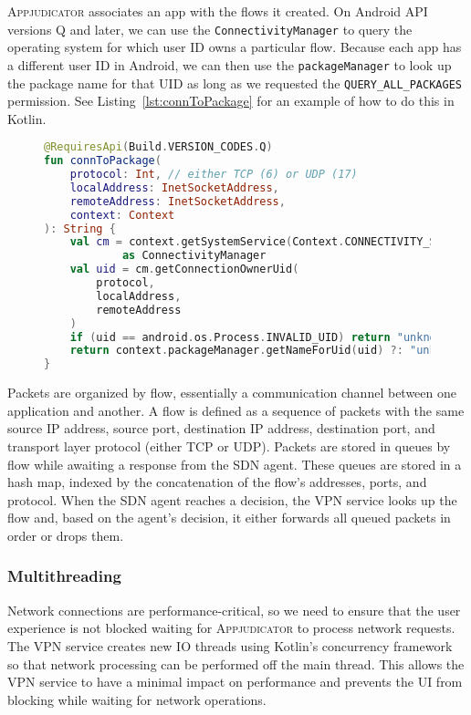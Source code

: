 \textsc{Appjudicator} associates an app with the flows it created.  On Android
API versions Q and later, we can use the \texttt{ConnectivityManager} to query
the operating system for which user ID owns a particular flow. Because each app
has a different user ID in Android, we can then use the \texttt{packageManager}
to look up the package name for that UID as long as we requested the
\texttt{QUERY\_ALL\_PACKAGES} permission. See Listing~\ref{lst:connToPackage}
for an example of how to do this in Kotlin.

\begin{figure}[h]
\begin{lstlisting}[caption={Source code to obtain the package that created a
		given network flow.},
	label={lst:connToPackage}, language=Kotlin]
@RequiresApi(Build.VERSION_CODES.Q)
fun connToPackage(
    protocol: Int, // either TCP (6) or UDP (17)
    localAddress: InetSocketAddress,
    remoteAddress: InetSocketAddress,
    context: Context
): String {
	val cm = context.getSystemService(Context.CONNECTIVITY_SERVICE)
			as ConnectivityManager
	val uid = cm.getConnectionOwnerUid(
		protocol,
		localAddress,
		remoteAddress
	)
	if (uid == android.os.Process.INVALID_UID) return "unknown"
	return context.packageManager.getNameForUid(uid) ?: "unknown"
}
\end{lstlisting}
\end{figure}

Packets are organized by flow, essentially a communication channel between one
application and another. A flow is defined as a sequence of packets with the
same source IP address, source port, destination IP address, destination port,
and transport layer protocol (either TCP or UDP). Packets are stored in queues
by flow while awaiting a response from the SDN agent. These queues are stored in
a hash map, indexed by the concatenation of the flow's addresses, ports, and
protocol. When the SDN agent reaches a decision, the VPN service looks up the
flow and, based on the agent's decision, it either forwards all queued packets
in order or drops them.

\subsubsection{Multithreading}
\label{sec:multithreading}

Network connections are performance-critical, so we need to ensure that the user
experience is not blocked waiting for \textsc{Appjudicator} to process network
requests. The VPN service creates new IO threads using Kotlin's concurrency
framework so that network processing can be performed off the main thread. This
allows the VPN service to have a minimal impact on performance and prevents the
UI from blocking while waiting for network operations.


